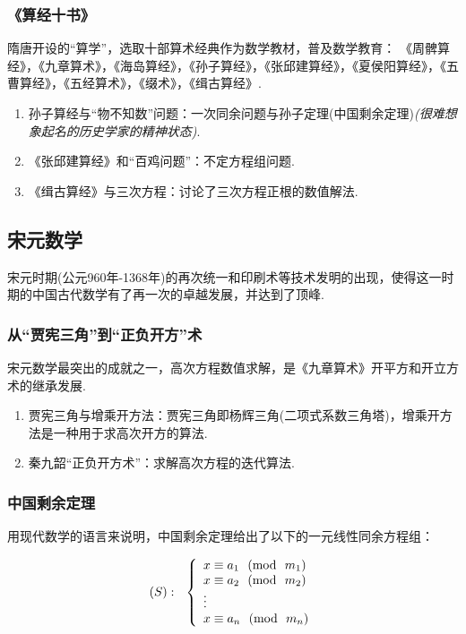 \documentclass{Math_Note}
\begin{document}
\subsubsection{《算经十书》}
隋唐开设的“算学”，选取十部算术经典作为数学教材，普及数学教育：
《周髀算经》，《九章算术》，《海岛算经》，《孙子算经》，《张邱建算经》，《夏侯阳算经》，《五曹算经》，《五经算术》，《缀术》，《缉古算经》.

\begin{enumerate}
    \item 孙子算经与“物不知数”问题：一次同余问题与孙子定理(中国剩余定理)\textit{(很难想象起名的历史学家的精神状态)}.
    \item 《张邱建算经》和“百鸡问题”：不定方程组问题.
    \item 《缉古算经》与三次方程：讨论了三次方程正根的数值解法.
\end{enumerate}

\subsection{宋元数学}
宋元时期(公元960年-1368年)的再次统一和印刷术等技术发明的出现，使得这一时期的中国古代数学有了再一次的卓越发展，并达到了顶峰.
\subsubsection{从“贾宪三角”到“正负开方”术}
宋元数学最突出的成就之一，高次方程数值求解，是《九章算术》开平方和开立方术的继承发展.

\begin{enumerate}
    \item 贾宪三角与增乘开方法：贾宪三角即杨辉三角(二项式系数三角塔)，增乘开方法是一种用于求高次开方的算法.
    \item 秦九韶“正负开方术”：求解高次方程的迭代算法.
\end{enumerate}

\subsubsection{中国剩余定理}
用现代数学的语言来说明，中国剩余定理给出了以下的一元线性同余方程组：

\begin{equation}
    (S):\ \ \left\{\begin{array}{l l}{{x\equiv a_{1}\ \ (\mathrm{mod}\ \ m_{1})}}\\ {{x\equiv a_{2}\ \ (\mathrm{mod}\ \ m_{2})}}\\ 
        {{\vdots}}\\ {{x\equiv a_{n}\ \ (\mathrm{mod}\ \ m_{n})}}\end{array}\right.
\end{equation}
\end{document}
